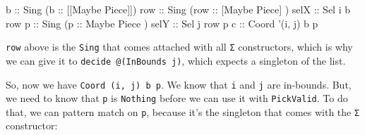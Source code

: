 \documentclass[]{article}
\newenvironment{Shaded}{}{}
\newcommand{\CommentTok}[1]{\textcolor[rgb]{0.38,0.63,0.69}{\textit{#1}}}
\newcommand{\DataTypeTok}[1]{\textcolor[rgb]{0.56,0.13,0.00}{#1}}
\newcommand{\FunctionTok}[1]{\textcolor[rgb]{0.02,0.16,0.49}{#1}}
\newcommand{\KeywordTok}[1]{\textcolor[rgb]{0.00,0.44,0.13}{\textbf{#1}}}
\newcommand{\NormalTok}[1]{#1}
\newcommand{\OtherTok}[1]{\textcolor[rgb]{0.00,0.44,0.13}{#1}}
\begin{document}
\begin{Shaded}
\begin{Highlighting}[]
\OtherTok{b    ::} \DataTypeTok{Sing}\NormalTok{ (}\OtherTok{b   ::}\NormalTok{ [[}\DataTypeTok{Maybe} \DataTypeTok{Piece}\NormalTok{]])}
\OtherTok{row  ::} \DataTypeTok{Sing}\NormalTok{ (}\OtherTok{row ::}\NormalTok{  [}\DataTypeTok{Maybe} \DataTypeTok{Piece}\NormalTok{] )}
\OtherTok{selX ::} \DataTypeTok{Sel}\NormalTok{ i b row}
\OtherTok{p    ::} \DataTypeTok{Sing}\NormalTok{ (}\OtherTok{p   ::}   \DataTypeTok{Maybe} \DataTypeTok{Piece}\NormalTok{  )}
\OtherTok{selY ::} \DataTypeTok{Sel}\NormalTok{ j row p}
\OtherTok{c    ::} \DataTypeTok{Coord}\NormalTok{ '(i, j) b p}
\end{Highlighting}
\end{Shaded}

\texttt{row} above is the \texttt{Sing} that comes attached with all \texttt{Σ}
constructors, which is why we can give it to \texttt{decide\ @(InBounds\ j)},
which expects a singleton of the list.

So, now we have \texttt{Coord\ \textquotesingle{}(i,\ j)\ b\ p}. We know that
\texttt{i} and \texttt{j} are in-bounds. But, we need to know that \texttt{p} is
\texttt{\textquotesingle{}Nothing} before we can use it with \texttt{PickValid}.
To do that, we can pattern match on \texttt{p}, because it's the singleton that
comes with the \texttt{Σ} constructor:

\begin{Shaded}
\end{Shaded}
\end{document}
